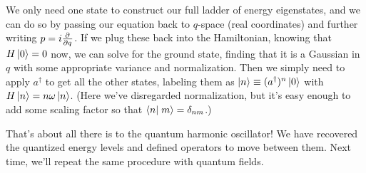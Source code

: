 We only need one state to construct our full ladder of energy eigenstates, and we can do so by passing our equation back to $q$-space (real coordinates) and further writing $p=i \P{}{q}$. If we plug these back into the Hamiltonian, knowing that $H\ket{0}=0$ now, we can solve for the ground state, finding that it is a Gaussian in $q$ with some appropriate variance and normalization. Then we simply need to apply $a^\dagger$ to get all the other states, labeling them as $\ket{n}\equiv(a^\dagger)^n \ket{0}$ with $H \ket{n}=n\omega \ket{n}$. (Here we've disregarded normalization, but it's easy enough to add some scaling factor so that $\braket{n}{m}=\delta_{nm}$.)

That's about all there is to the quantum harmonic oscillator! We have recovered the quantized energy levels and defined operators to move between them. Next time, we'll repeat the same procedure with quantum fields.